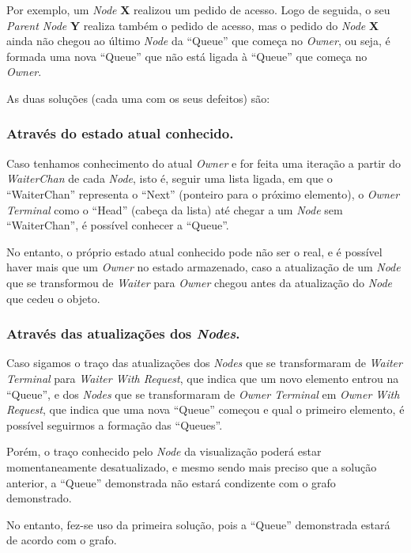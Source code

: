 Por exemplo, um \emph{Node} \textbf{X} realizou um pedido de acesso. Logo de seguida, o seu \emph{Parent Node} \textbf{Y}  realiza também o pedido de acesso, mas o pedido do \emph{Node} \textbf{X} ainda não chegou ao último \emph{Node} da ``Queue'' que começa no \emph{Owner}, ou seja, é formada uma nova ``Queue'' que não está ligada à ``Queue'' que começa no \emph{Owner}.


As duas soluções (cada uma com os seus defeitos) são:

\subsubsection*{Através do estado atual conhecido.}

Caso tenhamos conhecimento do atual \emph{Owner} e for feita uma iteração a partir do \emph{WaiterChan} de cada \emph{Node}, isto é, seguir uma lista ligada, em que o ``WaiterChan'' representa o ``Next'' (ponteiro para o próximo elemento), o \emph{Owner Terminal} como o ``Head'' (cabeça da lista) até chegar a um \emph{Node} sem ``WaiterChan'', é possível conhecer a ``Queue''.

No entanto, o próprio estado atual conhecido pode não ser o real, e é possível haver mais que um \emph{Owner}
no estado armazenado, caso a atualização de um \emph{Node} que se transformou de \emph{Waiter} para \emph{Owner} chegou antes da atualização do \emph{Node} que cedeu o objeto.


\subsubsection*{Através das atualizações dos \emph{Nodes}.}

Caso sigamos o traço das atualizações dos \emph{Nodes} que se transformaram de \emph{Waiter Terminal} para \emph{Waiter With Request}, que indica que um novo elemento entrou na ``Queue'', e dos \emph{Nodes}  que se transformaram de \emph{Owner Terminal} em \emph{Owner With Request}, que indica que uma nova ``Queue'' começou e qual o primeiro elemento, é possível seguirmos a formação das ``Queues''.

Porém, o traço conhecido pelo \emph{Node} da visualização poderá estar momentaneamente desatualizado, e mesmo sendo mais preciso que a solução anterior, a ``Queue'' demonstrada não estará condizente com o grafo demonstrado.

No entanto, fez-se uso da primeira solução, pois a ``Queue'' demonstrada estará de acordo com o grafo.

